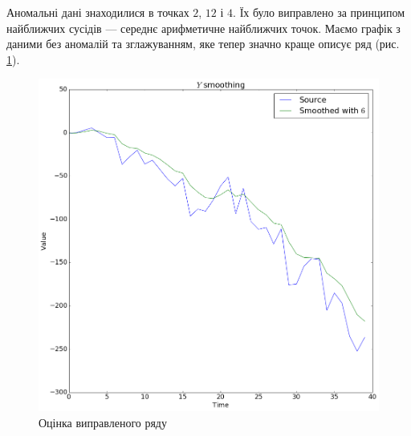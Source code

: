 % 
% 

Аномальні дані знаходилися в точках $2$, $12$ і $4$.
Їх було виправлено за принципом найближчих сусідів ---
середнє арифметичне найближчих точок.
Маємо графік з даними без аномалій та зглажуванням,
яке тепер значно краще описує ряд (рис. \ref{fig:anomaly:fixed}).

\begin{figure}[h!]
  \centering
  \includegraphics[width=\textwidth]{Coursework_files/Coursework_21_0.png}
  \caption{Оцінка виправленого ряду}
  \label{fig:anomaly:fixed}
\end{figure}

